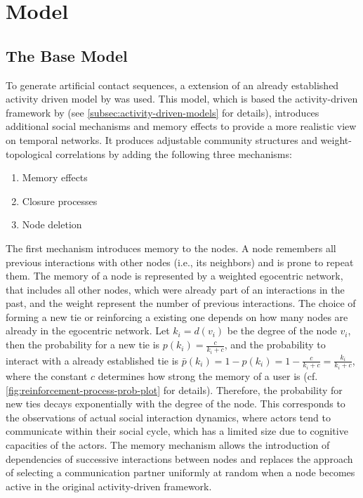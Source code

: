 \chapter{Model}


\section{The Base Model}



To generate artificial contact sequences, a extension of an already established activity driven model by \citet{Laurent2015} was used.
This model, which is based the activity-driven framework by \citet{Perra2012a} (see \autoref{subsec:activity-driven-models} for details), introduces additional social mechanisms and memory effects to provide a more realistic view on temporal networks.
It produces adjustable community structures and weight-topological correlations by adding the following three mechanisms:

\begin{enumerate}
    \item Memory effects
    \item Closure processes
    \item Node deletion
\end{enumerate}

The first mechanism introduces memory to the nodes. 
A node remembers all previous interactions with other nodes (i.e., its neighbors) and is prone to repeat them.
The memory of a node is represented by a weighted egocentric network, that includes all other nodes, which were already part of an interactions in the past, and the weight represent the number of previous interactions. 
The choice of forming a new tie or reinforcing a existing one depends on how many nodes are already in the egocentric network.
Let \(k_{i} = d(v_{i})\) be the degree of the node \(v_{i}\), then the probability for a new tie is \(p(k_{i}) = \frac{c}{k_{i} + c}\), and the probability to interact with a already established tie is \(\bar{p}(k_{i}) = 1 - p(k_{i}) = 1 - \frac{c}{k_{i} + c} = \frac{k_{i}}{k_{i} + c}\), where the constant \(c\) determines how strong the memory of a user is (cf.  \autoref{fig:reinforcement-process-prob-plot} for details).
Therefore, the probability for new ties decays exponentially with the degree of the node.
This corresponds to the observations of actual social interaction dynamics, where actors tend to communicate within their social cycle, which has a limited size due to cognitive capacities of the actors.
The memory mechanism allows the introduction of dependencies of successive interactions between nodes and replaces the approach of selecting a communication partner uniformly at random when a node becomes active in the original activity-driven framework.

